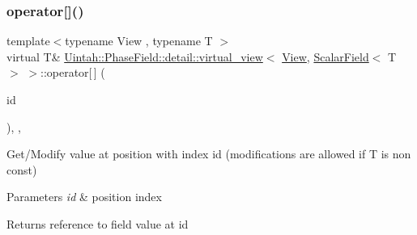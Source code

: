 \subsubsection{\texorpdfstring{operator[]()}{operator[]()}\hspace{0.1cm}{\footnotesize\ttfamily [1/2]}}
{\footnotesize\ttfamily template$<$typename View , typename T $>$ \\
virtual T\& \hyperlink{classUintah_1_1PhaseField_1_1detail_1_1virtual__view}{Uintah\+::\+Phase\+Field\+::detail\+::virtual\+\_\+view}$<$ \hyperlink{namespaceUintah_1_1PhaseField_a59210a1e28eba254d428762c92ddeabb}{View}, \hyperlink{structUintah_1_1PhaseField_1_1ScalarField}{Scalar\+Field}$<$ T $>$ $>$\+::operator\mbox{[}$\,$\mbox{]} (\begin{DoxyParamCaption}\item[{const Int\+Vector \&}]{id }\end{DoxyParamCaption})\hspace{0.3cm}{\ttfamily [inline]}, {\ttfamily [override]}, {\ttfamily [virtual]}}



Get/\+Modify value at position with index id (modifications are allowed if T is non const) 


\begin{DoxyParams}{Parameters}
{\em id} & position index \\
\hline
\end{DoxyParams}
\begin{DoxyReturn}{Returns}
reference to field value at id 
\end{DoxyReturn}
\mbox{\label{classUintah_1_1PhaseField_1_1detail_1_1virtual__view_3_01View_00_01ScalarField_3_01T_01_4_01_4_a1c8d0aeb10d5b0b3f04b44e41d61130b}} 
